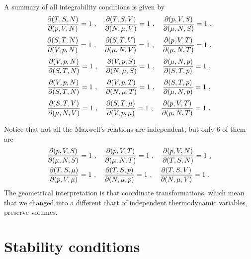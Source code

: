     A summary of all integrability conditions is given by 
    \begin{equation*}
        \frac{\partial(T, S, N)}{\partial(p, V, N)} = 1 ~, \quad \frac{\partial(T, S, V)}{\partial(N, \mu, V)} = 1 ~, \quad \frac{\partial(p, V, S)}{\partial(\mu, N, S)} = 1 ~,
    \end{equation*}
    \begin{equation*}
        \frac{\partial(S, T, N)}{\partial(V, p, N)} = 1 ~, \quad \frac{\partial(S, T, V)}{\partial(\mu, N, V)} = 1 ~, \quad \frac{\partial(p, V, T)}{\partial(\mu, N, T)} = 1 ~,
    \end{equation*}
    \begin{equation*}
        \frac{\partial(V, p, N)}{\partial(S, T, N)} = 1 ~, \quad \frac{\partial(V, p, S)}{\partial(N, \mu, S)} = 1 ~, \quad \frac{\partial(\mu, N, p)}{\partial(S, T, p)} = 1 ~,
    \end{equation*}
    \begin{equation*}
        \frac{\partial(V, p, N)}{\partial(S, T, N)} = 1 ~, \quad \frac{\partial(V, p, T)}{\partial(N, \mu, T)} = 1 ~, \quad \frac{\partial(S, T, p)}{\partial(\mu, N, p)} = 1 ~,
    \end{equation*}
    \begin{equation*}
        \frac{\partial(S, T, V)}{\partial(\mu, N, V)} = 1 ~, \quad \frac{\partial(S, T, \mu)}{\partial(V, p, \mu)} = 1 ~, \quad \frac{\partial(p, V, T)}{\partial(\mu, N, T)} = 1 ~.
    \end{equation*}

    Notice that not all the Maxwell's relations are independent, but only $6$ of them are
    \begin{equation}\label{td:max}
    \begin{gathered}
        \frac{\partial(p, V, S)}{\partial(\mu, N, S)} = 1 ~, \quad \frac{\partial(p, V, T)}{\partial(\mu, N, T)} = 1 ~, \quad \frac{\partial(p, V, N)}{\partial(T, S, N)} = 1 ~, \\ \frac{\partial(T, S, \mu)}{\partial(p, V, \mu)} = 1 ~, \quad \frac{\partial(T, S, p)}{\partial(N, \mu, p)} = 1 ~, \quad \frac{\partial(T, S, V)}{\partial(N, \mu, V)} = 1 ~.
    \end{gathered}
    \end{equation}
    The geometrical interpretation is that coordinate transformations, which mean that we changed into a different chart of independent thermodynamic variables, preserve volumes. 

\section{Stability conditions}

